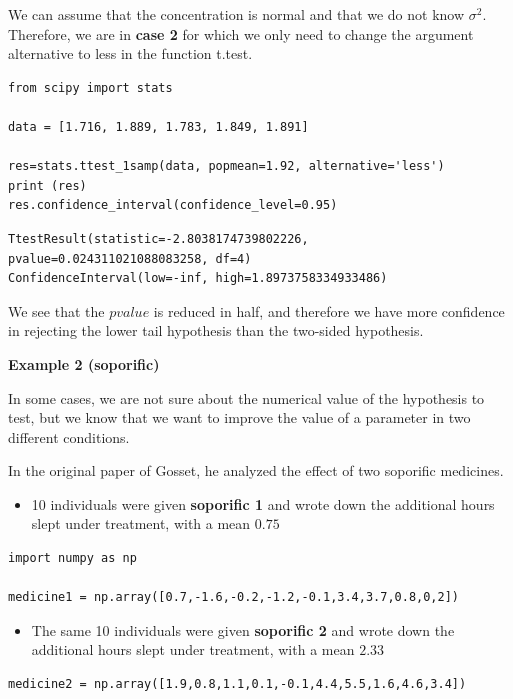 \documentclass[
]{book}
\providecommand{\tightlist}{%
  \setlength{\itemsep}{0pt}\setlength{\parskip}{0pt}}
\begin{document}
We can assume that the concentration is normal and that we do not know \(\sigma^2\). Therefore, we are in \textbf{case 2} for which we only need to change the argument alternative to less in the function t.test.

\begin{verbatim}
from scipy import stats

data = [1.716, 1.889, 1.783, 1.849, 1.891]

res=stats.ttest_1samp(data, popmean=1.92, alternative='less')
print (res)
res.confidence_interval(confidence_level=0.95)
\end{verbatim}

\begin{verbatim}
TtestResult(statistic=-2.8038174739802226, pvalue=0.024311021088083258, df=4)
ConfidenceInterval(low=-inf, high=1.8973758334933486)
\end{verbatim}

We see that the \(pvalue\) is reduced in half, and therefore we have more confidence in rejecting the lower tail hypothesis than the two-sided hypothesis.

\textbf{Example 2 (soporific)}

In some cases, we are not sure about the numerical value of the hypothesis to test, but we know that we want to improve the value of a parameter in two different conditions.

In the original paper of Gosset, he analyzed the effect of two soporific medicines.

\begin{itemize}
\tightlist
\item
  10 individuals were given \textbf{soporific 1} and wrote down the additional hours slept under treatment, with a mean \(0.75\)
\end{itemize}

\begin{verbatim}
import numpy as np

medicine1 = np.array([0.7,-1.6,-0.2,-1.2,-0.1,3.4,3.7,0.8,0,2])
\end{verbatim}

\begin{itemize}
\tightlist
\item
  The same 10 individuals were given \textbf{soporific 2} and wrote down the additional hours slept under treatment, with a mean \(2.33\)
\end{itemize}

\begin{verbatim}
medicine2 = np.array([1.9,0.8,1.1,0.1,-0.1,4.4,5.5,1.6,4.6,3.4])
\end{verbatim}
\end{document}

